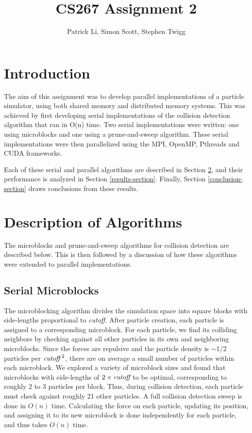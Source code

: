 \documentclass[11pt]{article} %
\title{CS267 Assignment 2}
\author{Patrick Li, Simon Scott, Stephen Twigg}
\begin{document}
\maketitle
\parskip 7.2pt

\section{Introduction}

The aim of this assignment was to develop parallel implementations of a particle simulator, using both shared memory and distributed memory systems. This was achieved by first developing serial implementations of the collision detection algorithm that ran in O(n) time. Two serial implementations were written: one using microblocks and one using a prune-and-sweep algorithm. These serial implementations were then parallelized using the MPI, OpenMP, Pthreads and CUDA frameworks.

Each of these serial and parallel algorithms are described in Section \ref{algorithm-section}, and their performance is analyzed in Section \ref{results-section}. Finally, Section \ref{conclusion-section} draws conclusions from these results.




\section{Description of Algorithms}
\label{algorithm-section}

The microblocks and prune-and-sweep algorithms for collision detection are described below. This is then followed by a discussion of how these algorithms were extended to parallel implementations.

\subsection{Serial Microblocks}

The microblocking algorithm divides the simulation space into square blocks with side-lengths proportional to {\em cutoff}. After particle creation, each particle is assigned to a corresponding microblock. For each particle, we find its colliding neighbors by checking against all other particles in its own and neighboring microblocks. Since the forces are repulsive and the particle density is $\sim$1/2 particles per $\text{\em cutoff}^\text{~2}$, there are on average a small number of particles within each microblock. We explored a variety of microblock sizes and found that microblocks with side-lengths of $2\times\text{\em cutoff}$ to be optimal, corresponding to roughly 2 to 3 particles per block. Thus, during collision detection, each particle must check against roughly 21 other particles. A full collision detection sweep is done in $O(n)$ time. Calculating the force on each particle, updating its position, and assigning it to its new microblock is done independently for each particle, and thus takes $O(n)$ time.
\end{document}
